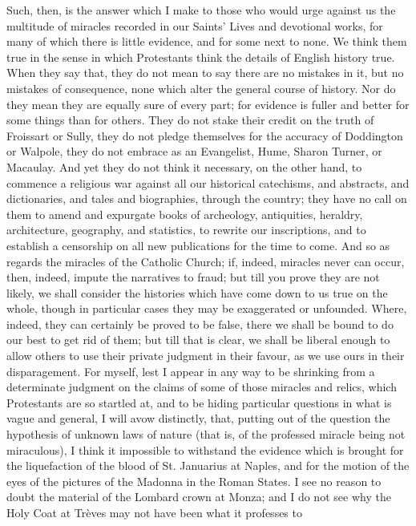 Such, then, is the answer which I make to those who
would urge against us the multitude of miracles recorded
in our Saints' Lives and devotional works, for many of
which there is little evidence, and for some next to
none. We think them true in the sense in which
Protestants think the details of English history true.
When they say that, they do not mean to say there are no
mistakes in it, but no mistakes of consequence, none
which alter the general course of history. Nor do they
mean they are equally sure of every part; for evidence is
fuller and better for some things than for others. They
do not stake their credit on the truth of Froissart or
Sully, they do not pledge themselves for the accuracy of
Doddington or Walpole, they do not embrace as an
Evangelist, Hume, Sharon Turner, or Macaulay. And yet
they do not think it necessary, on the other hand, to
commence a religious war against all our historical
catechisms, and abstracts, and dictionaries, and tales
and biographies, through the country; they have no call
on them to amend and expurgate books of archeology,
antiquities, heraldry, architecture, geography, and
statistics, to rewrite our inscriptions, and to establish
a censorship on all new publications for the time to
come. And so as regards the miracles of the Catholic
Church; if, indeed, miracles never can occur, then,
indeed, impute the narratives to fraud; but till you
prove they are not likely, we shall consider the
histories which have come down to us true on the whole,
though in particular cases they may be exaggerated or
unfounded. Where, indeed, they can certainly be proved to
be false, there we shall be bound to do our best to get
rid of them; but till that is clear, we shall be liberal
enough to allow others to use their private judgment in
their favour, as we use ours in their disparagement. For
myself, lest I appear in any way to be shrinking from a
determinate judgment on the claims of some of those
miracles and relics, which Protestants are so startled
at, and to be hiding particular questions in what is
vague and general, I will avow distinctly, that, putting
out of the question the hypothesis of unknown laws of
nature (that is, of the professed miracle being not
miraculous), I think it impossible to withstand the
evidence which is brought for the liquefaction of the
blood of St. Januarius at Naples, and for the motion of
the eyes of the pictures of the Madonna in the Roman
States. I see no reason to doubt the material of the
Lombard crown at Monza; and I do not see why the Holy
Coat at Trèves may not have been what it professes to
